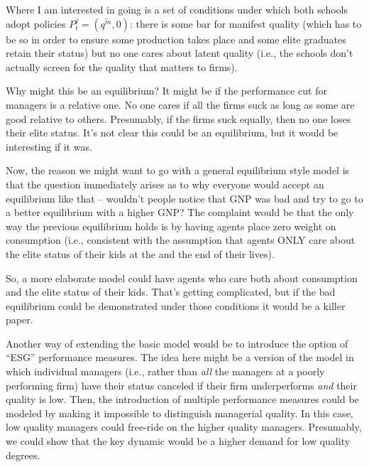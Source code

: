 \documentclass[
12pt,
titlepage,
reqno,
]{article}%
\begin{document}
Where I am interested in going is a set of conditions under which both schools adopt policies $P^j_t=(\bar{q^m},0)$: there is some bar for manifest quality (which has to be so in order to ensure some production takes place and some elite graduates retain their status) but no one cares about latent quality (i.e., the schools don't actually screen for the quality that matters to firms).

Why might this be an equilibrium?
It might be if the performance cut for managers is a relative one.
No one cares if all the firms suck as long as some are good relative to others.
Presumably, if the firms suck equally, then no one loses their elite status.
It's not clear this could be an equilibrium, but it would be interesting if it was.

Now, the reason we might want to go with a general equilibrium style model is that the question immediately arises as to why everyone would accept an equilibrium like that -- wouldn't people notice that GNP was bad and try to go to a better equilibrium with a higher GNP?
The complaint would be that the only way the previous equilibrium holds is by having agents place zero weight on consumption (i.e., consistent with the assumption that agents ONLY care about the elite status of their kids at the and the end of their lives).

So, a more elaborate model could have agents who care both about consumption and the elite status of their kids.
That's getting complicated, but if the bad equilibrium could be demonstrated under those conditions it would be a killer paper.

Another way of extending the basic model would be to introduce the option of ``ESG'' performance measures.
The idea here might be a version of the model in which individual managers (i.e., rather than \textit{all} the managers at a poorly performing firm) have their status canceled if their firm underperforms \textit{and} their quality is low.
Then, the introduction of multiple performance measures could be modeled by making it impossible to distinguish managerial quality.
In this case, low quality managers could free-ride on the higher quality managers.
Presumably, we could show that the key dynamic would be a higher demand for low quality degrees.
 
	
	
\end{document}
